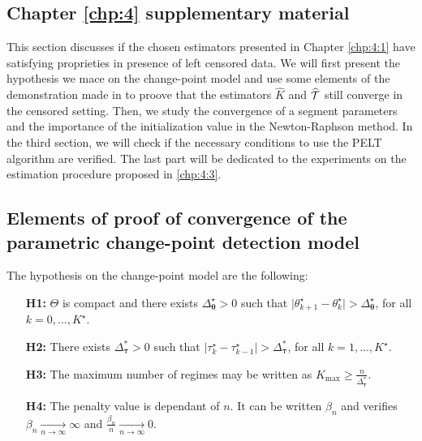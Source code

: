 \begin{appendices}
\chapter{Chapter \ref{chp:4} supplementary material} \label{app:chap4}

This section discusses if the chosen estimators presented in Chapter \ref{chp:4:1} have satisfying proprieties in presence of left censored data. We will first present the hypothesis we mace on the change-point model and use some elements of the demonstration made in \cite{Lavielle1997} to proove that the estimators $\widehat{K}$ and $\widehat{{\mathcal T}}$ still converge in the censored setting. Then, we study the convergence of a segment parameters and the importance of the initialization value in the Newton-Raphson method. In the third section, we will check if the necessary conditions to use the PELT algorithm are verified. The last part will be dedicated to the experiments on the estimation procedure proposed in \ref{chp:4:3}. 

\section{Elements of proof of convergence of the parametric change-point detection model}\label{app:chap4:1}

The hypothesis on the change-point model are the following:  
\begin{itemize}
\item[\textbf{H1:}] $\Theta$ is compact and there exists $\Delta_{\bm \theta}^{\star}>0$ such that $\vert \theta_{k+1}^{\star}-\theta_{k}^{\star}\vert > \Delta_{\bm \theta}^{\star}$, for all $k=0,...,K^{\star}$.
\item[\textbf{H2:}] There exists $\Delta_{\bm \tau}^*>0$ such that $\vert \tau_{k}^{\star}-\tau_{k-1}^{\star}\vert > \Delta^*_{\bm \tau}$, for all $k=1,...,K^{\star}$.
\item[\textbf{H3:}]  The maximum number of regimes may be written as $K_{\max} \geq \frac{n}{\Delta^*_{\bm \tau}}$. 
\item[\textbf{H4:}] The penalty value is dependant of $n$. It can be written $\beta_{n}$ and verifies $\beta_{n}\xrightarrow[n\rightarrow \infty]{} \infty$ and $\frac{\beta_{n}}{n}\xrightarrow[n\rightarrow \infty]{} 0$.
\end{itemize}


\end{appendices}
